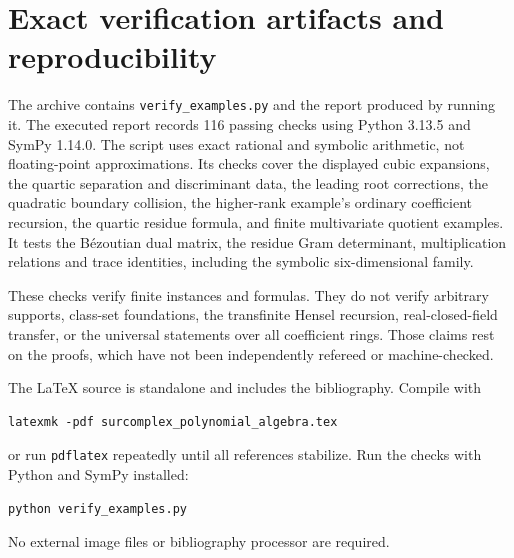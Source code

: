 \documentclass[11pt,letterpaper,oneside]{article}
\numberwithin{equation}{section}
\theoremstyle{definition}
\theoremstyle{remark}\newtheorem{remark}[theorem]{Remark}
\begin{document}
\section{Exact verification artifacts and reproducibility}\label{app:verification}
The archive contains \texttt{verify\_examples.py} and the report produced
by running it. The executed report records 116 passing checks using Python 3.13.5 and
SymPy 1.14.0. The script uses exact rational and symbolic arithmetic,
not floating-point approximations. Its checks cover the displayed cubic
expansions, the quartic separation and discriminant data, the leading
root corrections, the quadratic boundary collision, the higher-rank
example's ordinary coefficient recursion, the quartic residue formula,
and finite multivariate quotient examples. It tests the B\'ezoutian dual
matrix, the residue Gram determinant, multiplication relations and trace
identities, including the symbolic six-dimensional family.

These checks verify finite instances and formulas. They do not verify
arbitrary supports, class-set foundations, the transfinite Hensel recursion,
real-closed-field transfer, or the universal statements over all coefficient
rings. Those claims rest on the proofs, which have not been independently
refereed or machine-checked.

The \LaTeX{} source is standalone and includes the bibliography. Compile
with
\begin{verbatim}
latexmk -pdf surcomplex_polynomial_algebra.tex
\end{verbatim}
or run \texttt{pdflatex} repeatedly until all references stabilize.
Run the checks with Python and SymPy installed:
\begin{verbatim}
python verify_examples.py
\end{verbatim}
No external image files or bibliography processor are required.
\end{document}
